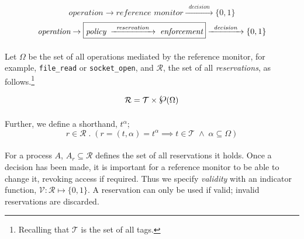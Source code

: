 \begin{equation}\label{eqn:res-1}
    \textit{operation} \rightarrow \boxed{\textit{reference monitor}} \xrightarrow{\;\;\textit{decision}\;\;} \{0,1\}
\end{equation}
\vspace{-3mm}
\begin{equation}\label{eqn:res-2}
    \textit{operation} \rightarrow \boxed{\textit{policy}\; \xrightarrow{\;\;\textit{reservation}\;\;} \;\textit{enforcement}} \xrightarrow{\;\;\textit{decision}\;\;} \{0,1\}
    \vspace{3mm}
\end{equation}


\paragraph{} Let $\Omega$ be the set of all operations mediated by the reference monitor, for example, \texttt{file\_read} or \texttt{socket\_open}, and $\mathcal{R}$, the set of all \textit{reservations}, as follows.\footnote{Recalling that $\mathcal{T}$ is the set of all tags.}

\newcommand{\powerset}{\raisebox{.15\baselineskip}{\Large\ensuremath{\wp}}}
\vspace{-5mm}
\begin{equation*}
    \mathcal{R} = \mathcal{T} \times \powerset(\Omega)
    \vspace{2mm}
\end{equation*}

\paragraph{} Further, we define a shorthand, $t^{\alpha}$;
\vspace{-3mm}
\begin{equation*}
    r \in \mathcal{R} \;.\; (r = (t, \alpha) = t^{\alpha} \implies t \in \mathcal{T} \; \wedge \; \alpha \subseteq \Omega)
\end{equation*}

\paragraph{} For a process $A$, $A_{r} \subseteq \mathcal{R}$ defines the set of all reservations it holds. Once a decision has been made, it is important for a reference monitor to be able to change it, revoking access if required. Thus we specify \textit{validity} with an indicator function, $\mathcal{V}: \mathcal{R} \mapsto \{0,1\}$. A reservation can only be used if valid; invalid reservations are discarded.

